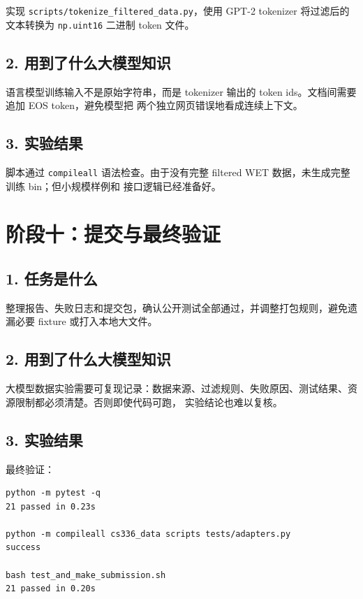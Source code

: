 \documentclass[UTF8,11pt]{ctexart}
\begin{document}
实现 \texttt{scripts/tokenize\_filtered\_data.py}，使用 GPT-2 tokenizer 将过滤后的文本转换为
\texttt{np.uint16} 二进制 token 文件。

\subsection*{2. 用到了什么大模型知识}

语言模型训练输入不是原始字符串，而是 tokenizer 输出的 token ids。文档间需要追加 EOS token，避免模型把
两个独立网页错误地看成连续上下文。

\subsection*{3. 实验结果}

脚本通过 \texttt{compileall} 语法检查。由于没有完整 filtered WET 数据，未生成完整训练 bin；但小规模样例和
接口逻辑已经准备好。

\section{阶段十：提交与最终验证}

\subsection*{1. 任务是什么}

整理报告、失败日志和提交包，确认公开测试全部通过，并调整打包规则，避免遗漏必要 fixture 或打入本地大文件。

\subsection*{2. 用到了什么大模型知识}

大模型数据实验需要可复现记录：数据来源、过滤规则、失败原因、测试结果、资源限制都必须清楚。否则即使代码可跑，
实验结论也难以复核。

\subsection*{3. 实验结果}

最终验证：

\begin{lstlisting}
python -m pytest -q
21 passed in 0.23s

python -m compileall cs336_data scripts tests/adapters.py
success

bash test_and_make_submission.sh
21 passed in 0.20s
\end{lstlisting}
\end{document}
